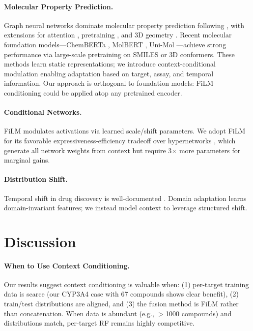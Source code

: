 \documentclass{article}
\begin{document}
\paragraph{Molecular Property Prediction.}
Graph neural networks dominate molecular property prediction following \citet{gilmer_2017_mpnn}, with extensions for attention \citep{xiong_2019_attentivefp}, pretraining \citep{rong_2020_grover, hu_2020_gnn_pretrain}, and 3D geometry \citep{schutt_2017_schnet, gasteiger_2020_dimenet}. Recent molecular foundation models---ChemBERTa \citep{chithrananda_2020_chemberta}, MolBERT \citep{fabian_2020_molbert}, Uni-Mol \citep{zhou_2023_unimol}---achieve strong performance via large-scale pretraining on SMILES or 3D conformers. These methods learn static representations; we introduce context-conditional modulation enabling adaptation based on target, assay, and temporal information. Our approach is orthogonal to foundation models: FiLM conditioning could be applied atop any pretrained encoder.

\paragraph{Conditional Networks.}
FiLM \citep{perez_2018_film} modulates activations via learned scale/shift parameters. We adopt FiLM for its favorable expressiveness-efficiency tradeoff over hypernetworks \citep{ha_2017_hypernetworks}, which generate all network weights from context but require 3$\times$ more parameters for marginal gains.

\paragraph{Distribution Shift.}
Temporal shift in drug discovery is well-documented \citep{sheridan_2013_time_split, martin_2019_temporal}. Domain adaptation \citep{ben_david_2010_theory} learns domain-invariant features; we instead model context to leverage structured shift.

\section{Discussion}
\label{sec:discussion}

\paragraph{When to Use Context Conditioning.}
Our results suggest context conditioning is valuable when: (1) per-target training data is scarce (our CYP3A4 case with 67 compounds shows clear benefit), (2) train/test distributions are aligned, and (3) the fusion method is FiLM rather than concatenation. When data is abundant (e.g., $>$1000 compounds) and distributions match, per-target RF remains highly competitive.
\end{document}
